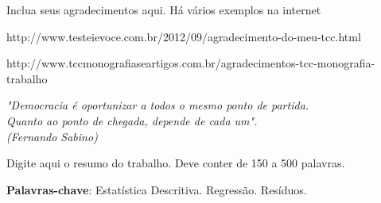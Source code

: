 \documentclass[
	12pt,				%
	openright,			%
	oneside,			%
	a4paper,			%
	brazil				%
	]{abntex2}
\begin{document}
\frenchspacing %


\imprimircapa

\imprimirfolhaderosto



\begin{agradecimentos}

Inclua seus agradecimentos aqui. Há vários exemplos na internet

http://www.testeievoce.com.br/2012/09/agradecimento-do-meu-tcc.html

http://www.tccmonografiaseartigos.com.br/agradecimentos-tcc-monografia-trabalho
\end{agradecimentos}

\begin{epigrafe} %
\vspace*{\fill}
\begin{flushright}
\textit{"Democracia é oportunizar a todos o mesmo ponto de partida. \\
         Quanto ao ponto de chegada, depende de cada um".\\
         (Fernando Sabino)}
\end{flushright}
\end{epigrafe}

\newpage
\setlength{\absparsep}{18pt}   %
\setlength{\abstitleskip}{1cm} %

\begin{resumo}

Digite aqui o resumo do trabalho. Deve conter de 150 a 500 palavras.

\textbf{Palavras-chave}: Estatística Descritiva. Regressão. Resíduos.
\end{resumo}
\end{document}
